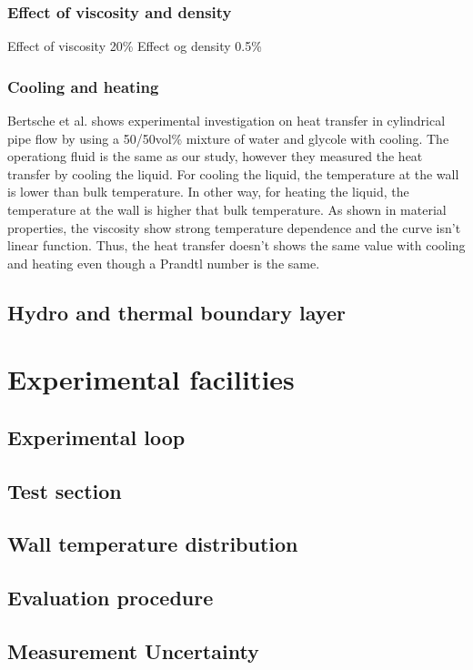 \documentclass[12pt,oneside]{jbook}
\begin{document}
\subsection{Effect of viscosity and density}
Effect of viscosity 20\%
Effect og density   0.5\%
\subsection{Cooling and heating}
Bertsche et al.\cite{Bertsche2016} shows experimental investigation on heat transfer in cylindrical pipe flow by using a 50/50vol\% mixture of water and glycole with cooling.
The operationg fluid is the same as our study, however they measured the heat transfer by cooling the liquid.
For cooling the liquid, the temperature at the wall is lower than bulk temperature.
In other way, for heating the liquid, the temperature at the wall is higher that bulk temperature.
As shown in material properties, the viscosity show strong temperature dependence and the curve isn't linear function.
Thus, the heat transfer doesn't shows the same value with cooling and heating even though a Prandtl number is the same.


\clearpage
\section{Hydro and thermal boundary layer}

\chapter{Experimental facilities}
\section{Experimental loop}
\section{Test section}
\section{Wall temperature distribution}
\section{Evaluation procedure}
\section{Measurement Uncertainty}
\end{document}
